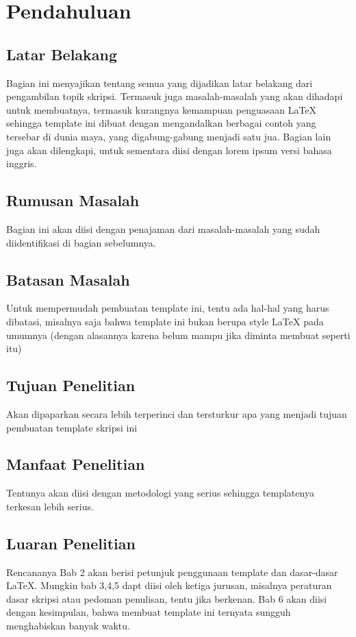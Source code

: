 \chapter{Pendahuluan}
\label{chap: pendahuluan}
\section{Latar Belakang}
\label{sec:label}

Bagian ini menyajikan tentang semua yang dijadikan latar belakang dari pengambilan topik skripsi.
Termasuk juga masalah-masalah yang akan dihadapi untuk membuatnya, termasuk kurangnya kemampuan penguasaan \LaTeX{} sehingga template ini dibuat dengan mengandalkan berbagai contoh yang tersebar di dunia maya, yang digabung-gabung menjadi satu jua.
Bagian lain juga akan dilengkapi, untuk sementara diisi dengan lorem ipsum versi bahasa inggris.


\section{Rumusan Masalah}
\label{sec:rumusan}
Bagian ini akan diisi dengan penajaman dari masalah-masalah yang sudah diidentifikasi di bagian sebelumnya. 


\section{Batasan Masalah}
\label{sec:batasan}
Untuk mempermudah pembuatan template ini, tentu ada hal-hal yang harus dibatasi, misalnya saja bahwa template ini bukan berupa style \LaTeX{} pada umumnya (dengan alasannya karena belum mampu jika diminta membuat seperti itu)


\section{Tujuan Penelitian}
\label{sec:tujuan}
Akan dipaparkan secara lebih terperinci dan tersturkur apa yang menjadi tujuan pembuatan template skripsi ini


\section{Manfaat Penelitian}
\label{sec:metlit}
Tentunya akan diisi dengan metodologi yang serius sehingga templatenya terkesan lebih serius.


\section{Luaran Penelitian}
\label{sec:sispem}
Rencananya Bab 2 akan berisi petunjuk penggunaan template dan dasar-dasar \LaTeX.
Mungkin bab 3,4,5 dapt diisi oleh ketiga jurusan, misalnya peraturan dasar skripsi atau pedoman penulisan, tentu jika berkenan.
Bab 6 akan diisi dengan kesimpulan, bahwa membuat template ini ternyata sungguh menghabiskan banyak waktu.

